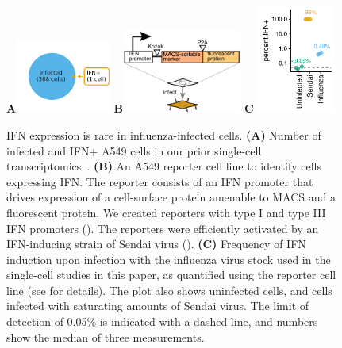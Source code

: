 \documentclass[9pt,lineno]{elife}
\begin{document}
\begin{figure}
\centerline{
{\bf \Large A}\includegraphics[width=0.28\textwidth,valign=t]{figures/IFN_stochastic/RussellVenn/venn_diagram.pdf}
\hspace{0.02\textwidth}
{\bf \Large B}\includegraphics[width=0.35\textwidth,valign=t]{figures/IFN_stochastic/IFN_reporter/IFN_reporter.pdf}
\hspace{0.02\textwidth}
{\bf \Large C} \includegraphics[width=0.23\textwidth,valign=t]{figures/IFN_stochastic/Flow/ifn_percent.pdf}
}
\caption{
IFN expression is rare in influenza-infected cells.
{\bf (A)} Number of infected and IFN+ A549 cells in our prior single-cell transcriptomics~\citep{russell2018extreme}.
{\bf (B)} An A549 reporter cell line to identify cells expressing IFN.
The reporter consists of an IFN promoter that drives expression of a cell-surface protein amenable to MACS and a fluorescent protein.
We created reporters with type I and type III IFN promoters ().
The reporters were efficiently activated by an IFN-inducing strain of Sendai virus ().
{\bf (C)}
Frequency of IFN induction upon infection with the influenza virus stock used in the single-cell studies in this paper, as quantified using the reporter cell line (see  for details).
The plot also shows uninfected cells, and cells infected with saturating amounts of Sendai virus.
The limit of detection of 0.05\% is indicated with a dashed line, and numbers show the median of three measurements.
}
\label{fig:IFNrare}


\end{figure}
\end{document}
